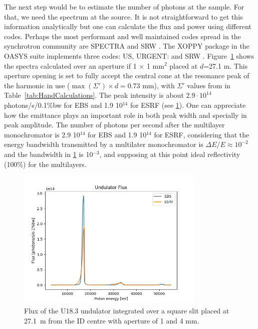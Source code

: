 \documentclass{iucr}              %
\begin{document}
The next step would be to estimate the number of photons at the sample. For that, we need the spectrum at the source. It is not straightforward to get this information analytically but one can calculate the flux and power using different codes. Perhaps the most performant and well maintained codes spread in the synchrotron community are SPECTRA \cite{codeSPECTRA} and SRW \cite{codeSRW}. The XOPPY package in the OASYS suite implements three codes: US\cite{codeUS}, URGENT: \cite{codeURGENT} and SRW \cite{codeSRW}. Figure~\ref{fig:FluxU18} shows the spectra calculated over an aperture if 1 $\times$ 1 mm$^2$ placed at $d$=27.1 m. This aperture opening is set to fully accept the central cone at the resonance peak of the harmonic in use ($\max(\Sigma') \times d = 0.73$ mm), with $\Sigma'$ values from in Table~\ref{tab:HandCalculations}. The peak intensity is about  $2.9\cdot10^{14}$ photons/s/0.1{\%}bw for EBS and 1.9 10$^{14}$ for ESRF (see \ref{fig:FluxU18}). One can appreciate how the emittance plays an important role in both peak width and specially in peak amplitude. The number of photons per second after the multilayer monochromator is 2.9 10$^{14}$ for EBS and 1.9 10$^{14}$ for ESRF, considering that the energy bandwidth transmitted by a multilater monochromator is $\Delta E/E \approx 10^{-2}$ and the bandwidth in \ref{fig:FluxU18} is 10$^{-3}$, and supposing at this point ideal reflectivity (100\%) for the multilayers. 

\begin{figure}\label{fig:FluxU18}
    \centering
    \includegraphics[width=0.8\textwidth]{GRAPHICS/fluxU18.png}
    \caption{Flux of the U18.3 undulator integrated over a square slit placed at 27.1~m from the ID centre with aperture of 1 and 4 mm.}
\end{figure}
\end{document}
